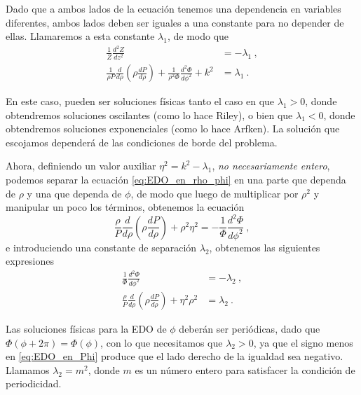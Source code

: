 Dado que a ambos lados de la ecuación tenemos una dependencia en variables diferentes, ambos lados deben ser iguales a una constante para no depender de ellas. Llamaremos a esta constante $\lambda_1$, de modo que
\begin{align}
    \frac{1}{Z} \frac{d^2Z}{dz^2} & = - \lambda_1 \ , \\
    \frac{1}{\rho P} \frac{d}{d\rho} \left( \rho \frac{dP}{d\rho} \right) + \frac{1}{\rho^2 \Phi} \frac{d^2 \Phi}{d\phi^2} + k^2 & = \lambda_1 \ . \label{eq:EDO_en_rho_phi}
\end{align}

En este caso, pueden ser soluciones físicas tanto el caso en que $\lambda_1>0$, donde obtendremos soluciones oscilantes (como lo hace Riley), o bien que $\lambda_1 < 0$, donde obtendremos soluciones exponenciales (como lo hace Arfken). La solución que escojamos dependerá de las condiciones de borde del problema.


Ahora, definiendo un valor auxiliar $\eta^2 = k^2 - \lambda_1$, \emph{no necesariamente entero}, podemos separar la ecuación \eqref{eq:EDO_en_rho_phi} en una parte que dependa de $\rho$ y una que dependa de $\phi$, de modo que luego de multiplicar por $\rho^2$ y manipular un poco los términos, obtenemos la ecuación
\begin{equation}
    \frac{\rho}{P} \frac{d}{d\rho} \left( \rho \frac{dP}{d\rho} \right) + \rho^2 \eta^2 = - \frac{1}{\Phi} \frac{d^2 \Phi}{d\phi^2} \ , 
\end{equation}
e introduciendo una constante de separación $\lambda_2$, obtenemos las siguientes expresiones
\begin{align}
    \frac{1}{\Phi} \frac{d^2 \Phi}{d\phi^2} & = - \lambda_2 \ , \label{eq:EDO_en_Phi} \\
    \frac{\rho}{P} \frac{d}{d\rho} \left( \rho \frac{dP}{d\rho} \right) + \eta^2 \rho^2 & = \lambda_2 \ .
\end{align}

Las soluciones físicas para la EDO de $\phi$ deberán ser periódicas, dado que $\Phi(\phi + 2\pi) = \Phi(\phi)$, con lo que necesitamos que $\lambda_2 > 0$, ya que el signo menos en \eqref{eq:EDO_en_Phi} produce que el lado derecho de la igualdad sea negativo. Llamamos $\lambda_2 = m^2$, donde $m$ es un número entero para satisfacer la condición de periodicidad.


